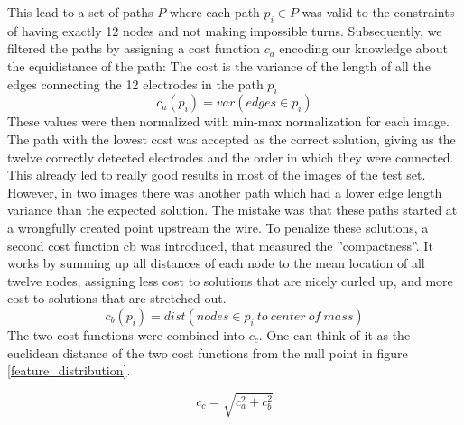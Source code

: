 \documentclass[a4paper, 10pt, twocolumn]{article}
\begin{document}
This lead to a set of paths $P$ where each path $p_i \in P$ was valid to the constraints of having exactly 12 nodes and not making impossible turns. Subsequently, we filtered the paths by assigning a cost function $c_a$ encoding our knowledge about the equidistance of the path: The cost is the variance of the length of all the edges connecting the 12 electrodes in the path $p_i$
$$ c_a(p_i)=var(edges\in p_i)$$
These values were then normalized with min-max normalization for each image. The path with the lowest cost was accepted as the correct solution, giving us the twelve correctly detected electrodes and the order in which they were connected. This already led to really good results in most of the images of the test set. However, in two images there was another path which had a lower edge length variance than the expected solution. The mistake was that these paths started at a wrongfully created point upstream the wire. To penalize these solutions, a second cost function cb was introduced, that measured the ”compactness”. It works by summing up all distances of each node to the mean location of all twelve nodes, assigning less cost to solutions that are nicely curled up, and more cost to solutions that are stretched out.
$$ c_b(p_i)=dist (nodes \in p_i\ to\ center\ of\ mass)$$
The two cost functions were combined into $c_ {c}$. One can think of it as the euclidean distance of the two cost functions from the null point in figure \ref{feature_distribution}.

$$c_{c} = \sqrt{c_a^2+c_b^2}$$
\end{document}
